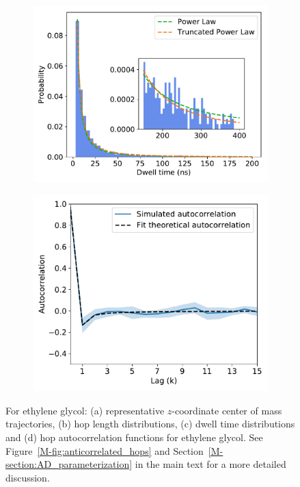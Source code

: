 \documentclass{article}
\begin{document}
\begin{figure}
  \begin{subfigure}{0.45\textwidth}
  \includegraphics[width=\textwidth]{GCL_powerlaw.pdf}
  \caption{}\label{fig:GCL_powerlaw}
  \end{subfigure}
  \begin{subfigure}{0.45\textwidth}
  \includegraphics[width=\textwidth]{GCL_hop_acf.pdf}
  \caption{}\label{fig:GCL_hop_acf}
  \end{subfigure}
  \caption{For ethylene glycol: (a) representative $z$-coordinate center of mass trajectories, (b) hop 
  length distributions, (c) dwell time distributions and (d) hop autocorrelation functions
  for ethylene glycol. See Figure~\ref{M-fig:anticorrelated_hops} and Section~\ref{M-section:AD_parameterization}
  in the main text for a more detailed discussion.}\label{fig:GCL_anticorrelated_hops}
  \end{figure}
  
\end{document}
